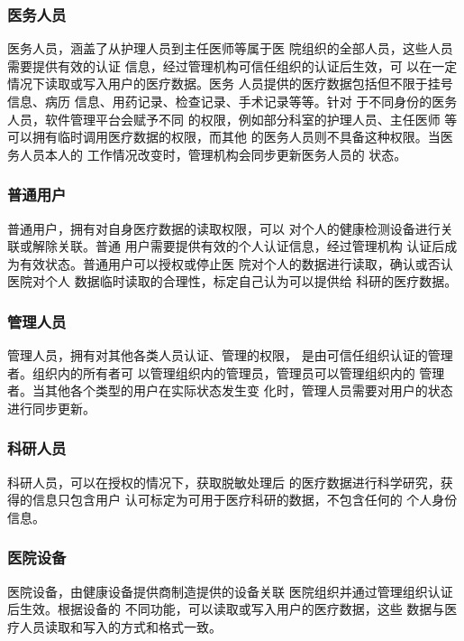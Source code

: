 \documentclass[UTF8]{ctexart}
\begin{document}
    \subsubsection{医务人员}
    \par
    医务人员，涵盖了从护理人员到主任医师等属于医
    院组织的全部人员，这些人员需要提供有效的认证
    信息，经过管理机构可信任组织的认证后生效，可
    以在一定情况下读取或写入用户的医疗数据。医务
    人员提供的医疗数据包括但不限于挂号信息、病历
    信息、用药记录、检查记录、手术记录等等。针对
    于不同身份的医务人员，软件管理平台会赋予不同
    的权限，例如部分科室的护理人员、主任医师
    等可以拥有临时调用医疗数据的权限，而其他
    的医务人员则不具备这种权限。当医务人员本人的
    工作情况改变时，管理机构会同步更新医务人员的
    状态。
    \subsubsection{普通用户}
    \par
    普通用户，拥有对自身医疗数据的读取权限，可以
    对个人的健康检测设备进行关联或解除关联。普通
    用户需要提供有效的个人认证信息，经过管理机构
    认证后成为有效状态。普通用户可以授权或停止医
    院对个人的数据进行读取，确认或否认医院对个人
    数据临时读取的合理性，标定自己认为可以提供给
    科研的医疗数据。

    \subsubsection{管理人员}
    \par
    管理人员，拥有对其他各类人员认证、管理的权限，
    是由可信任组织认证的管理者。组织内的所有者可
    以管理组织内的管理员，管理员可以管理组织内的
    管理者。当其他各个类型的用户在实际状态发生变
    化时，管理人员需要对用户的状态进行同步更新。
    \subsubsection{科研人员}
    \par
    科研人员，可以在授权的情况下，获取脱敏处理后
    的医疗数据进行科学研究，获得的信息只包含用户
    认可标定为可用于医疗科研的数据，不包含任何的
    个人身份信息。
    \subsubsection{医院设备}
    \par
    医院设备，由健康设备提供商制造提供的设备关联
    医院组织并通过管理组织认证后生效。根据设备的
    不同功能，可以读取或写入用户的医疗数据，这些
    数据与医疗人员读取和写入的方式和格式一致。
\end{document}
